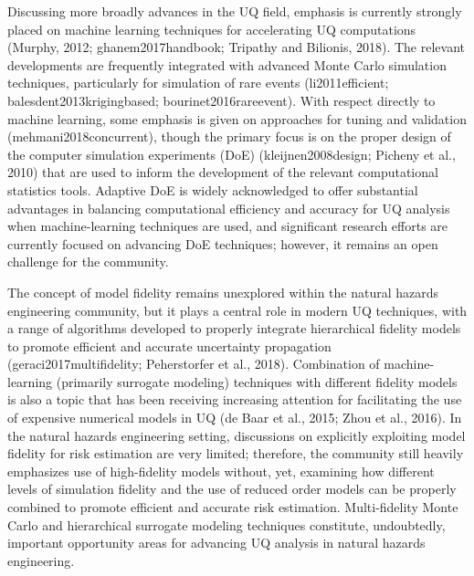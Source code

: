 Discussing more broadly advances in the UQ field, emphasis is currently strongly placed on machine learning techniques for accelerating UQ computations (Murphy, 2012; ghanem2017handbook; Tripathy and Bilionis, 2018). The relevant developments are frequently integrated with advanced Monte Carlo simulation techniques, particularly for simulation of rare events (li2011efficient; balesdent2013krigingbased; bourinet2016rareevent). With respect directly to machine learning, some emphasis is given on approaches for tuning and validation (mehmani2018concurrent), though the primary focus is on the proper design of the computer simulation experiments (DoE) (kleijnen2008design; Picheny et al., 2010) that are used to inform the development of the relevant computational statistics tools. Adaptive DoE is widely acknowledged to offer substantial advantages in balancing computational efficiency and accuracy for UQ analysis when machine-learning techniques are used, and significant research efforts are currently focused on advancing DoE techniques; however, it remains an open challenge for the community. 

The concept of model fidelity remains unexplored within the natural hazards engineering community, but it plays a central role in modern UQ techniques, with a range of algorithms developed to properly integrate hierarchical fidelity models to promote efficient and accurate uncertainty propagation (geraci2017multifidelity; Peherstorfer et al., 2018). Combination of machine-learning (primarily surrogate modeling) techniques with different fidelity models is also a topic that has been receiving increasing attention for facilitating the use of expensive numerical models in UQ (de Baar et al., 2015; Zhou et al., 2016). In the natural hazards engineering setting, discussions on explicitly exploiting model fidelity for risk estimation are very limited; therefore, the community still heavily emphasizes use of high-fidelity models without, yet, examining how different levels of simulation fidelity and the use of reduced order models can be properly combined to promote efficient and accurate risk estimation. Multi-fidelity Monte Carlo and hierarchical surrogate modeling techniques constitute, undoubtedly, important opportunity areas for advancing UQ analysis in natural hazards engineering.

